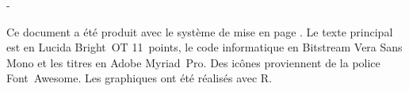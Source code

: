 \thispagestyle{empty}
\vspace*{\fill}

\begingroup
\calccentering{\unitlength}
\begin{adjustwidth*}{\unitlength}{-\unitlength}
  \begin{flushleft}
    \small %
    Ce document a été produit avec le système de mise en page {\XeLaTeX}.
    Le texte principal est en Lucida Bright~OT 11~points, le code
    informatique en Bitstream Vera Sans Mono et les titres en Adobe
    Myriad~Pro. Des icônes proviennent de la police Font~Awesome.
    Les graphiques ont été réalisés avec R.
  \end{flushleft}
\end{adjustwidth*}
\endgroup
\vfill
